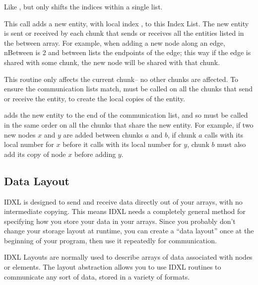 Like , but only shifts the indices within a single list.



This call adds a new entity, with local index , to this Index List.  The new entity is sent or received by each chunk that sends or receives all the entities listed in the between array.  For example, when adding a new node along an edge, nBetween is 2 and between lists the endpoints of the edge; this way if the edge is shared with some chunk, the new node will be shared with that chunk.

This routine only affects the current chunk-- no other chunks are affected.  To ensure the communication lists match,  must be called on all the chunks that send or receive the entity, to create the local copies of the entity.

 adds the new entity to the end of the communication list, and so must be called in the same order on all the chunks that share the new entity.  For example, if two new nodes $x$ and $y$ are added between chunks $a$ and $b$, if chunk $a$ calls  with its local number for $x$ before it calls  with its local number for $y$, chunk $b$ must also add its copy of node $x$ before adding $y$.


\subsection{Data Layout}
\label{sec:IDXLLayout}
IDXL is designed to send and receive data directly out of your arrays, with no intermediate copying.  This means IDXL needs a completely general method for specifying how you store your data in your arrays.  Since you probably don't change your storage layout at runtime, you can create a ``data layout'' once at the beginning of your program, then use it repeatedly for communication.

IDXL Layouts are normally used to describe arrays of data associated with nodes or elements.  The layout abstraction allows you to use IDXL routines to communicate any sort of data, stored in a variety of formats.

